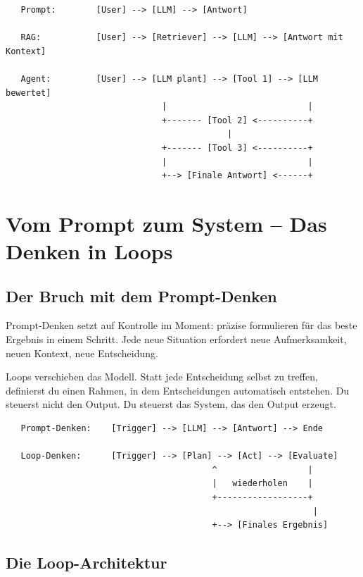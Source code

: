 \begin{verbatim}
   Prompt:        [User] --> [LLM] --> [Antwort]

   RAG:           [User] --> [Retriever] --> [LLM] --> [Antwort mit Kontext]

   Agent:         [User] --> [LLM plant] --> [Tool 1] --> [LLM bewertet]
                               |                            |
                               +------- [Tool 2] <----------+
                                            |
                               +------- [Tool 3] <----------+
                               |                            |
                               +--> [Finale Antwort] <------+
\end{verbatim}

\section{Vom Prompt zum System -- Das Denken in Loops}

\subsection{Der Bruch mit dem Prompt-Denken}

Prompt-Denken setzt auf Kontrolle im Moment: präzise formulieren für das beste Ergebnis in einem Schritt. Jede neue Situation erfordert neue Aufmerksamkeit, neuen Kontext, neue Entscheidung.

Loops verschieben das Modell. Statt jede Entscheidung selbst zu treffen, definierst du einen Rahmen, in dem Entscheidungen automatisch entstehen. Du steuerst nicht den Output. Du steuerst das System, das den Output erzeugt.

\begin{verbatim}
   Prompt-Denken:    [Trigger] --> [LLM] --> [Antwort] --> Ende

   Loop-Denken:      [Trigger] --> [Plan] --> [Act] --> [Evaluate]
                                         ^                  |
                                         |   wiederholen    |
                                         +------------------+
                                                             |
                                         +--> [Finales Ergebnis]
\end{verbatim}

\subsection{Die Loop-Architektur}


